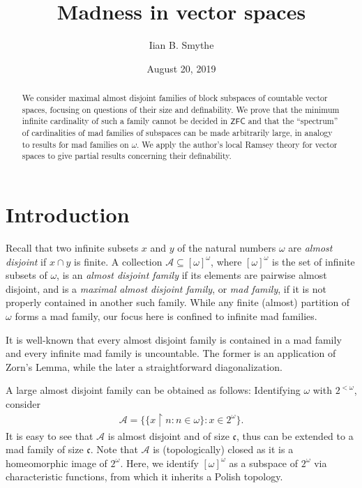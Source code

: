\documentclass[11pt]{amsart}
\title{Madness in vector spaces}
\date{August 20, 2019}
\author{Iian B. Smythe}
\newcommand{\restr}{\upharpoonright}
\newcommand{\LA}{\mathcal{A}}
\theoremstyle{definition}
\theoremstyle{remark}
\newcommand{\ZFC}{\mathsf{ZFC}}
\renewcommand{\1}{\mathbf{1}}
\newcommand{\cc}{\mathfrak{c}}
\begin{document}
\begin{abstract}
	We consider maximal almost disjoint families of block subspaces of countable vector spaces, focusing on questions of their size and definability. We prove that the minimum infinite cardinality of such a family cannot be decided in $\ZFC$ and that the ``spectrum'' of cardinalities of mad families of subspaces can be made arbitrarily large, in analogy to results for mad families on $\omega$. We apply the author's local Ramsey theory for vector spaces \cite{MR3864398} to give partial results concerning their definability.
\end{abstract}

\maketitle

\section{Introduction}\label{sec:Intro}

Recall that two infinite subsets $x$ and $y$ of the natural numbers $\omega$ are \emph{almost disjoint} if $x\cap y$ is finite. A collection $\LA\subseteq[\omega]^\omega$, where $[\omega]^\omega$ is the set of infinite subsets of $\omega$, is an \emph{almost disjoint family} if its elements are pairwise almost disjoint, and is a \emph{maximal almost disjoint family}, or \emph{mad family}, if it is not properly contained in another such family. While any finite (almost) partition of $\omega$ forms a mad family, our focus here is confined to infinite mad families.

It is well-known that every almost disjoint family is contained in a mad family and every infinite mad family is uncountable. The former is an application of Zorn's Lemma, while the later a straightforward diagonalization.

A large almost disjoint family can be obtained as follows: Identifying $\omega$ with $2^{<\omega}$, consider
\begin{align}\label{ex:perfect_ad}
	\LA=\{\{x\restr n:n\in\omega\}:x\in 2^\omega\}.
\end{align}
It is easy to see that $\LA$ is almost disjoint and of size $\cc$, thus can be extended to a mad family of size $\cc$. Note that $\LA$ is (topologically) closed as it is a homeomorphic image of $2^\omega$. Here, we identify $[\omega]^\omega$ as a subspace of $2^\omega$ via characteristic functions, from which it inherits a Polish topology.
\end{document}
